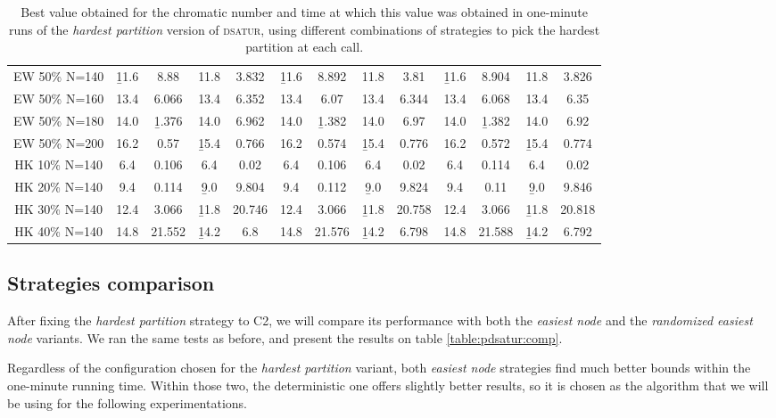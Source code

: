 \begin{sidewaystable}
\begin{tabular}{|c|cc|cc|cc|cc|cc|cc|}
\\
EW 50\% N=140 & \b{11.6} & 8.88 & 11.8 & 3.832 & \b{11.6} & 8.892 & 11.8 & 3.81 & \b{11.6} & 8.904 & 11.8 & 3.826
\\
EW 50\% N=160 & 13.4 & 6.066 & 13.4 & 6.352 & 13.4 & 6.07 & 13.4 & 6.344 & 13.4 & 6.068 & 13.4 & 6.35
\\
EW 50\% N=180 & 14.0 & \b{1.376} & 14.0 & 6.962 & 14.0 & \b{1.382} & 14.0 & 6.97 & 14.0 & \b{1.382} & 14.0 & 6.92
\\
EW 50\% N=200 & 16.2 & 0.57 & \b{15.4} & 0.766 & 16.2 & 0.574 & \b{15.4} & 0.776 & 16.2 & 0.572 & \b{15.4} & 0.774
\\
\hline
HK 10\% N=140 &  6.4 & 0.106 &  6.4 & 0.02 &  6.4 & 0.106 &  6.4 & 0.02 &  6.4 & 0.114 &  6.4 & 0.02
\\
HK 20\% N=140 &  9.4 & 0.114 &  \b{9.0} & 9.804 &  9.4 & 0.112 &  \b{9.0} & 9.824 &  9.4 & 0.11 &  \b{9.0} & 9.846
\\
HK 30\% N=140 & 12.4 & 3.066 & \b{11.8} & 20.746 & 12.4 & 3.066 & \b{11.8} & 20.758 & 12.4 & 3.066 & \b{11.8} & 20.818
\\
HK 40\% N=140 & 14.8 & 21.552 & \b{14.2} &  6.8 & 14.8 & 21.576 & \b{14.2} & 6.798 & 14.8 & 21.588 & \b{14.2} & 6.792
\\
\hline 
 \end{tabular}
\caption{Best value obtained for the chromatic number and time at which this value was obtained in one-minute runs of the \textit{hardest partition} version of \textsc{dsatur}, using different combinations of strategies to pick the hardest partition at each call.}
\label{table:pdsatur:hardp}

\end{sidewaystable}

\subsection{Strategies comparison}

After fixing the \textit{hardest partition} strategy to C2, we will compare its performance with both the \textit{easiest node} and the \textit{randomized easiest node} variants. We ran the same tests as before, and present the results on table \ref{table:pdsatur:comp}.

Regardless of the configuration chosen for the \textit{hardest partition} variant, both \textit{easiest node} strategies find much better bounds within the one-minute running time. Within those two, the deterministic one offers slightly better results, so it is chosen as the algorithm that we will be using for the following experimentations.

